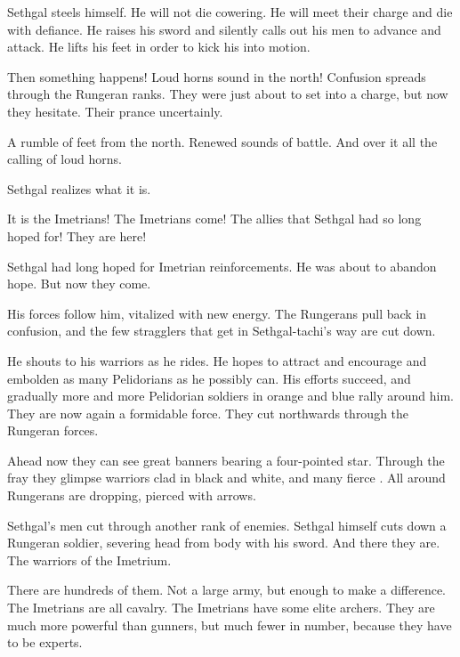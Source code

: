 Sethgal steels himself.
He will not die cowering. 
He will meet their charge and die with defiance. 
He raises his sword and silently calls out his men to advance and attack.
He lifts his feet in order to kick his \relc into motion. 

Then something happens! 
Loud horns sound in the north! 
Confusion spreads through the Rungeran ranks.
They were just about to set into a charge, but now they hesitate. 
Their \relcs prance uncertainly. 

A rumble of feet from the north.
Renewed sounds of battle. 
And over it all the calling of loud horns. 

Sethgal realizes what it is. 

It is the Imetrians!
The Imetrians come!
The allies that Sethgal had so long hoped for!
They are here! 

Sethgal had long hoped for Imetrian reinforcements. 
He was about to abandon hope.
But now they come. 


His forces follow him, vitalized with new energy. 
The Rungerans pull back in confusion, and the few stragglers that get in Sethgal-tachi's way are cut down. 

He shouts to his warriors as he rides. 
He hopes to attract and encourage and embolden as many Pelidorians as he possibly can. 
His efforts succeed, and gradually more and more Pelidorian soldiers in orange and blue rally around him. 
They are now again a formidable force. 
They cut northwards through the Rungeran forces. 

Ahead now they can see great banners bearing a four-pointed star. 
Through the fray they glimpse warriors clad in black and white, and many fierce \saurians. 
All around Rungerans are dropping, pierced with arrows. 

Sethgal's men cut through another rank of enemies. 
Sethgal himself cuts down a Rungeran soldier, severing head from body with his sword. 
And there they are.
The warriors of the Imetrium. 

There are hundreds of them. 
Not a large army, but enough to make a difference. 
The Imetrians are all cavalry. 
The Imetrians have some elite archers. 
They are much more powerful than gunners, but much fewer in number, because they have to be experts.

